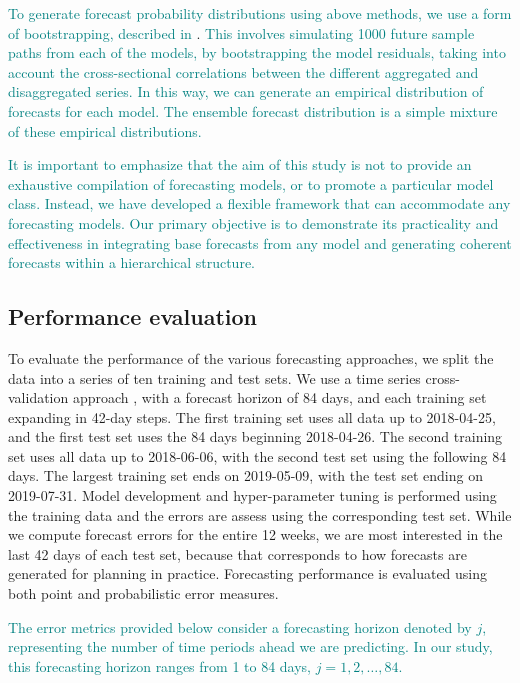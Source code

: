 \documentclass[
  authoryear,
  preprint,
  3p]{elsarticle}
\begin{document}
\textcolor{teal}{To generate forecast probability distributions using above methods, we use a form of bootstrapping, described in}
\citet{panagiotelis2023probabilistic}.
\textcolor{teal}{This involves simulating 1000 future sample paths from each of the models, by bootstrapping the model residuals, taking into account the cross-sectional correlations between the different aggregated and disaggregated series. In this way, we can generate an empirical distribution of forecasts for each model. The ensemble forecast distribution is a simple mixture of these empirical distributions.}

\textcolor{teal}{It is important to emphasize that the aim of this study is not to provide an exhaustive compilation of forecasting models, or to promote a particular model class. Instead, we have developed a flexible framework that can accommodate any forecasting models. Our primary objective is to demonstrate its practicality and effectiveness in integrating base forecasts from any model and generating coherent forecasts within a hierarchical structure.}

\hypertarget{performance-evaluation}{%
\subsection{Performance evaluation}\label{performance-evaluation}}

To evaluate the performance of the various forecasting approaches, we
split the data into a series of ten training and test sets. We use a
time series cross-validation approach \citep{hyndman2021forecasting},
with a forecast horizon of 84 days, and each training set expanding in
42-day steps. The first training set uses all data up to 2018-04-25, and
the first test set uses the 84 days beginning 2018-04-26. The second
training set uses all data up to 2018-06-06, with the second test set
using the following 84 days. The largest training set ends on
2019-05-09, with the test set ending on 2019-07-31. Model development
and hyper-parameter tuning is performed using the training data and the
errors are assess using the corresponding test set. While we compute
forecast errors for the entire 12 weeks, we are most interested in the
last 42 days of each test set, because that corresponds to how forecasts
are generated for planning in practice. Forecasting performance is
evaluated using both point and probabilistic error measures.

\textcolor{teal}{The error metrics provided below consider a forecasting horizon denoted by $j$, representing the number of time periods ahead we are predicting. In our study, this forecasting horizon ranges from 1 to 84 days, $j= 1,2,\dots, 84$.}
\end{document}

